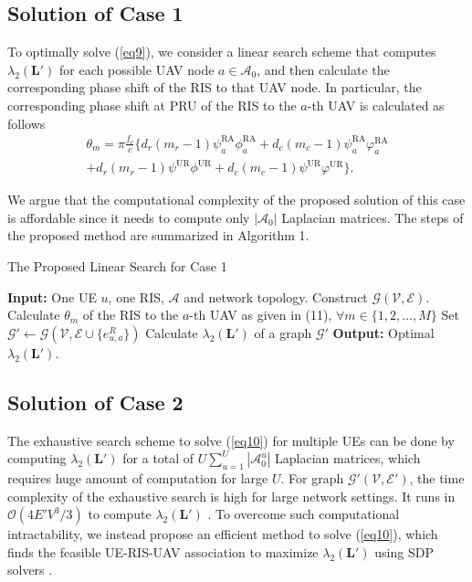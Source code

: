 \documentclass[conference]{IEEEtran}
\begin{document}
\subsection{Solution of Case 1}
To optimally solve (\ref{eq9}), we consider a linear search scheme that computes  $\lambda_2(\mathbf L')$ for each possible UAV node $a \in \mathcal A_0$, and then calculate the corresponding phase shift of the RIS to that UAV node. In particular, the corresponding phase shift at PRU of the RIS to the $a$-th UAV is calculated  as follows \cite{9293155}
\begin{multline} \label{phase} 
\theta_{m}= \pi \frac{f_c}{c}\bigg\{ d_r(m_r-1)\psi^\text{RA}_{a}   \phi^\text{RA}_{a}+d_c(m_c-1)\psi^\text{RA}_{a} \varphi^\text{RA}_{a}
\\+d_r(m_r-1)\psi^\text{UR}\phi^\text{UR}  +d_c(m_c-1)\psi^\text{UR}\varphi^\text{UR}\bigg\}.
\end{multline}

We argue that the computational complexity of the proposed solution of this case is affordable since it needs to compute only $|\mathcal A_0|$ Laplacian matrices. The steps of the proposed method are summarized in Algorithm 1.

\begin{algorithm}[t!]
	\caption{The Proposed Linear Search for Case 1}
	\label{Algorithm2}
	\begin{algorithmic}[1]
		\State \textbf{Input:} One UE $u$, one RIS, $\mathcal A$ and network topology.
        \State Construct $\mathcal G(\mathcal V, \mathcal E)$.
        \State Calculate $\theta_m$ of the RIS to the $a$-th UAV as given in (11), $\forall m\in \{1, 2, \ldots, M\}$
        \State Set $\mathcal G' \leftarrow \mathcal G(\mathcal V, \mathcal E \cup \{e^{R}_{u,a}\})$
         \State Calculate $\lambda_2 (\mathbf L')$ of a graph $\mathcal G'$
         \EndFor         
	\State \textbf{Output:} Optimal $\lambda_2(\mathbf L')$.
	\end{algorithmic}
\end{algorithm}

\subsection{Solution of Case 2}
The exhaustive search scheme to solve (\ref{eq10}) for multiple UEs can be done by computing $\lambda_2 (\mathbf L')$ for a total of $U \sum_{u=1}^U |\mathcal A^u_0|$ Laplacian matrices, which requires huge amount of computation for large $U$. For graph $\mathcal G'(\mathcal V, \mathcal E')$,  the time complexity of the exhaustive search is high for large network settings. It runs in $\mathcal O(4 E' V^3/3)$ to compute $\lambda_2(\mathbf L')$ \cite{L}. To overcome such computational intractability, we instead propose an efficient method to solve (\ref{eq10}), which finds the feasible UE-RIS-UAV association to maximize $\lambda_2 (\mathbf L')$ using SDP solvers \cite{SDP-M}.
\end{document}
